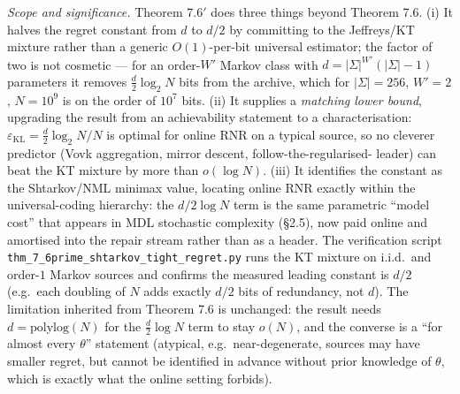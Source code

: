 \documentclass[
]{article}
\begin{document}
\emph{Scope and significance.} Theorem 7.6$'$ does three things beyond
Theorem 7.6. (i) It halves the regret constant from $d$ to $d/2$ by
committing to the Jeffreys/KT mixture rather than a generic
$O(1)$-per-bit universal estimator; the factor of two is not
cosmetic --- for an order-$W'$ Markov class with $d = |\Sigma|^{W'}
(|\Sigma|-1)$ parameters it removes $\tfrac{d}{2}\log_2 N$ bits from
the archive, which for $|\Sigma|=256$, $W'=2$, $N=10^9$ is on the
order of $10^7$ bits. (ii) It supplies a \emph{matching lower bound},
upgrading the result from an achievability statement to a
characterisation: $\varepsilon_{\mathrm{KL}} = \tfrac{d}{2}\log_2 N/N$
is optimal for online RNR on a typical source, so no cleverer
predictor (Vovk aggregation, mirror descent, follow-the-regularised-
leader) can beat the KT mixture by more than $o(\log N)$. (iii) It
identifies the constant as the Shtarkov/NML minimax value, locating
online RNR exactly within the universal-coding hierarchy: the
$d/2\log N$ term is the same parametric ``model cost'' that appears
in MDL stochastic complexity (§2.5), now paid online and amortised
into the repair stream rather than as a header. The verification
script \texttt{thm\_7\_6prime\_shtarkov\_tight\_regret.py} runs the KT
mixture on i.i.d.\ and order-$1$ Markov sources and confirms the
measured leading constant is $d/2$ (e.g.\ each doubling of $N$ adds
exactly $d/2$ bits of redundancy, not $d$). The limitation inherited
from Theorem 7.6 is unchanged: the result needs $d=\mathrm{polylog}(N)$
for the $\tfrac{d}{2}\log N$ term to stay $o(N)$, and the converse is a
``for almost every $\theta$'' statement (atypical, e.g.\ near-degenerate,
sources may have smaller regret, but cannot be identified in advance
without prior knowledge of $\theta$, which is exactly what the online
setting forbids).
\end{document}
